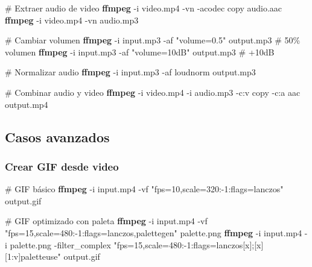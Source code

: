 \documentclass[
  11pt,
  letterpaper,
  oneside,
  openany]{scrbook}
\newenvironment{Shaded}{}{}
\newcommand{\AttributeTok}[1]{\textcolor[rgb]{0.84,0.23,0.29}{#1}}
\newcommand{\CommentTok}[1]{\textcolor[rgb]{0.42,0.45,0.49}{#1}}
\newcommand{\ExtensionTok}[1]{\textcolor[rgb]{0.84,0.23,0.29}{\textbf{#1}}}
\newcommand{\NormalTok}[1]{\textcolor[rgb]{0.14,0.16,0.18}{#1}}
\newcommand{\StringTok}[1]{\textcolor[rgb]{0.01,0.18,0.38}{#1}}
\begin{document}
\begin{Shaded}
\begin{Highlighting}[]
\CommentTok{\# Extraer audio de video}
\ExtensionTok{ffmpeg} \AttributeTok{{-}i}\NormalTok{ video.mp4 }\AttributeTok{{-}vn} \AttributeTok{{-}acodec}\NormalTok{ copy audio.aac}
\ExtensionTok{ffmpeg} \AttributeTok{{-}i}\NormalTok{ video.mp4 }\AttributeTok{{-}vn}\NormalTok{ audio.mp3}

\CommentTok{\# Cambiar volumen}
\ExtensionTok{ffmpeg} \AttributeTok{{-}i}\NormalTok{ input.mp3 }\AttributeTok{{-}af} \StringTok{"volume=0.5"}\NormalTok{ output.mp3  }\CommentTok{\# 50\% volumen}
\ExtensionTok{ffmpeg} \AttributeTok{{-}i}\NormalTok{ input.mp3 }\AttributeTok{{-}af} \StringTok{"volume=10dB"}\NormalTok{ output.mp3  }\CommentTok{\# +10dB}

\CommentTok{\# Normalizar audio}
\ExtensionTok{ffmpeg} \AttributeTok{{-}i}\NormalTok{ input.mp3 }\AttributeTok{{-}af}\NormalTok{ loudnorm output.mp3}

\CommentTok{\# Combinar audio y video}
\ExtensionTok{ffmpeg} \AttributeTok{{-}i}\NormalTok{ video.mp4 }\AttributeTok{{-}i}\NormalTok{ audio.mp3 }\AttributeTok{{-}c:v}\NormalTok{ copy }\AttributeTok{{-}c:a}\NormalTok{ aac output.mp4}
\end{Highlighting}
\end{Shaded}

\subsection{Casos avanzados}\label{casos-avanzados}

\subsubsection{Crear GIF desde video}\label{crear-gif-desde-video}

\begin{Shaded}
\begin{Highlighting}[]
\CommentTok{\# GIF básico}
\ExtensionTok{ffmpeg} \AttributeTok{{-}i}\NormalTok{ input.mp4 }\AttributeTok{{-}vf} \StringTok{"fps=10,scale=320:{-}1:flags=lanczos"}\NormalTok{ output.gif}

\CommentTok{\# GIF optimizado con paleta}
\ExtensionTok{ffmpeg} \AttributeTok{{-}i}\NormalTok{ input.mp4 }\AttributeTok{{-}vf} \StringTok{"fps=15,scale=480:{-}1:flags=lanczos,palettegen"}\NormalTok{ palette.png}
\ExtensionTok{ffmpeg} \AttributeTok{{-}i}\NormalTok{ input.mp4 }\AttributeTok{{-}i}\NormalTok{ palette.png }\AttributeTok{{-}filter\_complex} \StringTok{"fps=15,scale=480:{-}1:flags=lanczos[x];[x][1:v]paletteuse"}\NormalTok{ output.gif}
\end{Highlighting}
\end{Shaded}
\end{document}
